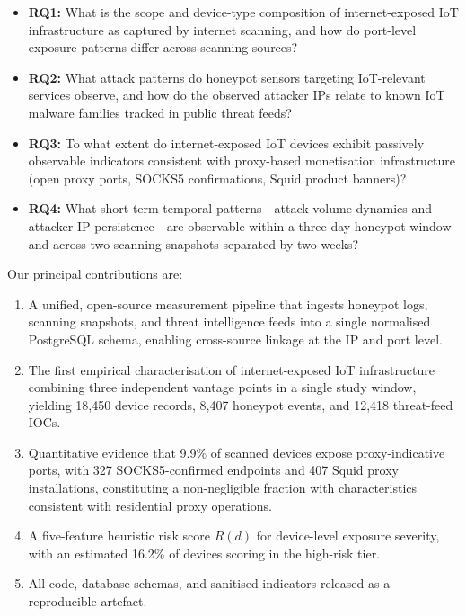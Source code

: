 \documentclass[journal]{IEEEtran}
\begin{document}
\begin{itemize}
  \item \textbf{RQ1:} What is the scope and device-type composition of
    internet-exposed IoT infrastructure as captured by internet scanning,
    and how do port-level exposure patterns differ across scanning sources?
  \item \textbf{RQ2:} What attack patterns do honeypot sensors targeting
    IoT-relevant services observe, and how do the observed attacker IPs relate
    to known IoT malware families tracked in public threat feeds?
  \item \textbf{RQ3:} To what extent do internet-exposed IoT devices exhibit
    passively observable indicators consistent with proxy-based monetisation
    infrastructure (open proxy ports, SOCKS5 confirmations, Squid product
    banners)?
  \item \textbf{RQ4:} What short-term temporal patterns---attack volume
    dynamics and attacker IP persistence---are observable within a three-day
    honeypot window and across two scanning snapshots separated by two weeks?
\end{itemize}

\noindent Our principal contributions are:

\begin{enumerate}
  \item A unified, open-source measurement pipeline that ingests honeypot
    logs, scanning snapshots, and threat intelligence feeds into a single
    normalised PostgreSQL schema, enabling cross-source linkage at the IP
    and port level.
  \item The first empirical characterisation of internet-exposed IoT
    infrastructure combining three independent vantage points in a single
    study window, yielding 18{,}450 device records, 8{,}407 honeypot events,
    and 12{,}418 threat-feed IOCs.
  \item Quantitative evidence that 9.9\% of scanned devices expose
    proxy-indicative ports, with 327 SOCKS5-confirmed endpoints and 407
    Squid proxy installations, constituting a non-negligible fraction with
    characteristics consistent with residential proxy operations.
  \item A five-feature heuristic risk score $R(d)$ for device-level exposure
    severity, with an estimated 16.2\% of devices scoring in the high-risk tier.
  \item All code, database schemas, and sanitised indicators released as a
    reproducible artefact.
\end{enumerate}
\end{document}
